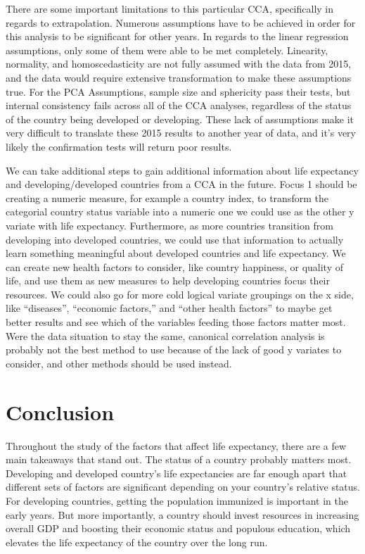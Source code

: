 \documentclass[12pt]{article}
\begin{document}
\begin{multicols}{2}
There are some important limitations to this particular CCA, specifically in regards to extrapolation. Numerous assumptions have to be achieved in order for this analysis to be significant for other years. In regards to the linear regression assumptions, only some of them were able to be met completely. Linearity, normality, and homoscedasticity are not fully assumed with the data from 2015, and the data would require extensive transformation to make these assumptions true. For the PCA Assumptions, sample size and sphericity pass their tests, but internal consistency fails across all of the CCA analyses, regardless of the status of the country being developed or developing. These lack of assumptions make it very difficult to translate these 2015 results to another year of data, and it’s very likely the confirmation tests will return poor results.

We can take additional steps to gain additional information about life expectancy and developing/developed countries from a CCA in the future. Focus 1 should be creating a numeric measure, for example a country index, to transform the categorial country status variable into a numeric one we could use as the other y variate with life expectancy. Furthermore, as more countries transition from developing into developed countries, we could use that information to actually learn something meaningful about developed countries and life expectancy. We can create new health factors to consider, like country happiness, or quality of life, and use them as new measures to help developing countries focus their resources. We could also go for more cold logical variate groupings on the x side, like “diseases”, “economic factors,” and “other health factors” to maybe get better results and see which of the variables feeding those factors matter most. Were the data situation to stay the same, canonical correlation analysis is probably not the best method to use because of the lack of good y variates to consider, and other methods should be used instead.


\section{Conclusion}
Throughout the study of the factors that affect life expectancy, there are a few main takeaways that stand out. The status of a country probably matters most. Developing and developed country’s life expectancies are far enough apart that different sets of factors are significant depending on your country’s relative status. For developing countries, getting the population immunized is important in the early years. But more importantly, a country should invest resources in increasing overall GDP and boosting their economic status and populous education, which elevates the life expectancy of the country over the long run.


\end{multicols}
\end{document}
